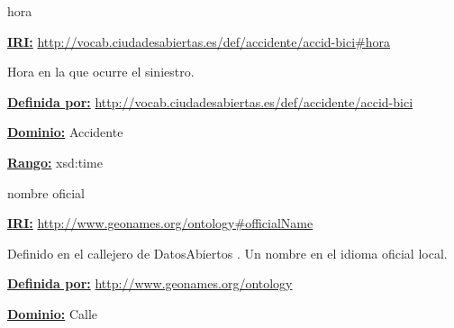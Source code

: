\begin{mybox}{hora}
\begin{flushleft}
\underline{\textbf{IRI:}}
\url{http://vocab.ciudadesabiertas.es/def/accidente/accid-bici#hora}
\newline

Hora en la que ocurre el siniestro.
\newline

\underline{\textbf{Definida por:}}
\url{http://vocab.ciudadesabiertas.es/def/accidente/accid-bici}
\newline

\underline{\textbf{Dominio:}} 
\newline Accidente
\newline

\underline{\textbf{Rango:}} 
\newline xsd:time

\end{flushleft}
\end{mybox}



\begin{mybox}{nombre oficial}
\begin{flushleft}
\underline{\textbf{IRI:}}
\url{http://www.geonames.org/ontology#officialName}
\newline

Definido en el callejero de DatosAbiertos \cite{ciudadesbiertas_callejero}.
Un nombre en el idioma oficial local.
\newline


\underline{\textbf{Definida por:}}
\url{http://www.geonames.org/ontology}
\newline

\underline{\textbf{Dominio:}}
	Calle
\newline


\end{flushleft}
\end{mybox}




